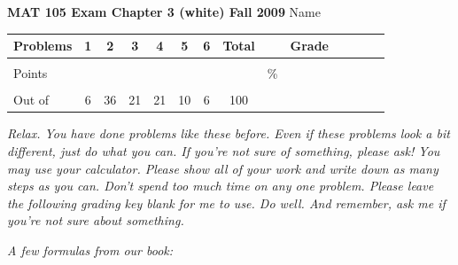 \documentclass[12pt]{article}
\begin{document}
{\bf MAT 105 Exam Chapter 3 (white) Fall 2009} \hspace{.4in} {\large Name} \hrulefill

\hrulefill


\begin{center}

\begin{tabular}
{|l|c|c|c|c|c|c|c|c|c|c|c|c|c|} \hline

 Problems & \hspace{5 pt} 1 \hspace{5 pt}  & \hspace{5 pt} 2 \hspace{5 pt} & \hspace{5 pt} 3 \hspace{5 pt} & \hspace{5 pt} 4 \hspace{5 pt} & \hspace{5 pt} 5 \hspace{5 pt} &  \hspace{5 pt} 6 \hspace{5 pt} &  \hspace{5 pt} Total  \hspace{5 pt} & &  \hspace{5 pt} Grade \hspace{5 pt}  \\ \hline
&&&&&&& &&\\  
Points &&&&&&& &    \hspace{.8in}\% &  \\ 
&&&&&& &&& \\  \hline
Out of & 6 & 36  & 21 & 21 & 10 & 6 &100 & & \\ \hline

\end {tabular}
 
\end{center}
 \emph{Relax.  You have done problems like these before.  Even if these problems look a bit different, just do what you can.  If you're not sure of something, please ask! You may use your calculator.  Please show all of your work and write down as many steps as you can.  Don't spend too much time on any one problem.  Please leave the following grading key blank for me to use.  Do well.  And remember, ask me if you're not sure about something.}
 
 \vspace{.1 in}
 
 \emph{A few formulas from our book:}
  \vspace{.2in}
 
\end{document}
